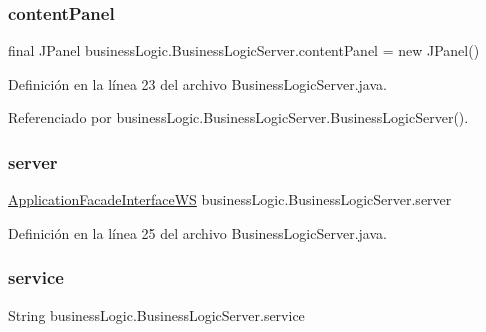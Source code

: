 \subsubsection{\texorpdfstring{contentPanel}{contentPanel}}
{\footnotesize\ttfamily final J\+Panel business\+Logic.\+Business\+Logic\+Server.\+content\+Panel = new J\+Panel()\hspace{0.3cm}{\ttfamily [private]}}



Definición en la línea 23 del archivo Business\+Logic\+Server.\+java.



Referenciado por business\+Logic.\+Business\+Logic\+Server.\+Business\+Logic\+Server().

\mbox{\label{classbusiness_logic_1_1_business_logic_server_ad1b90ed3ddcce431e7b064bb4a4631ed}} 
\subsubsection{\texorpdfstring{server}{server}}
{\footnotesize\ttfamily \mbox{\hyperlink{interfacebusiness_logic_1_1_application_facade_interface_w_s}{Application\+Facade\+Interface\+WS}} business\+Logic.\+Business\+Logic\+Server.\+server\hspace{0.3cm}{\ttfamily [package]}}



Definición en la línea 25 del archivo Business\+Logic\+Server.\+java.

\mbox{\label{classbusiness_logic_1_1_business_logic_server_a474037df64d451baf01fcb6f582cde2a}} 
\subsubsection{\texorpdfstring{service}{service}}
{\footnotesize\ttfamily String business\+Logic.\+Business\+Logic\+Server.\+service\hspace{0.3cm}{\ttfamily [package]}}



